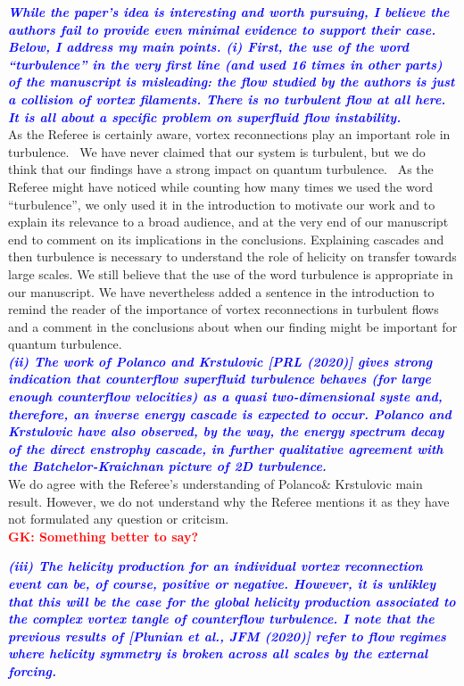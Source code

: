 \documentclass[a4paper,10pt]{article}
\def\red#1{\textcolor{red}{#1}}
\def\blue#1{\textcolor{blue}{#1}}
\def\refcomment#1{\textbf{\blue{\emph{#1}}}\\}
\begin{document}
\refcomment{While the paper’s idea is interesting and worth pursuing, I believe the authors fail to provide even minimal evidence to support their case. Below, I address my main points.
(i) First, the use of the word “turbulence” in the very first line (and used 16 times in other parts) of the manuscript is misleading: the flow studied by the authors is just a collision of vortex filaments. There is no turbulent flow at all here. It is all about a specific problem on superfluid flow instability.}

As the Referee is certainly aware, vortex reconnections play an important role in turbulence.  We have never claimed that our system is turbulent, but we do think that our findings have a strong impact on quantum turbulence.  As the Referee might have noticed while counting how many times we used the word “turbulence”, we only used it in the introduction to motivate our work and to explain its relevance to a broad audience, and at the very end of our manuscript end to comment on its implications in the conclusions. Explaining cascades and then turbulence is necessary to understand the role of helicity on transfer towards large scales. We still believe that the use of the word turbulence is appropriate in our manuscript. We have nevertheless added a sentence in the introduction to remind the reader of the importance of vortex reconnections in turbulent flows and a comment in the conclusions about when our finding might be important for quantum turbulence. \\

\refcomment{(ii) The work of Polanco and Krstulovic [PRL (2020)] gives strong indication that counterflow superfluid turbulence behaves (for large enough counterflow velocities) as a quasi two-dimensional syste and, therefore, an inverse energy cascade is expected to occur. Polanco and Krstulovic have also observed, by the way, the energy spectrum decay of the direct enstrophy cascade, in further qualitative agreement with the Batchelor-Kraichnan picture of 2D turbulence.}

We do agree with the Referee’s understanding of Polanco\& Krstulovic main result. However, we do not understand why the Referee mentions it as they have not formulated any question or critcism.\\

\red{\textbf{GK: Something better to say?}}

\refcomment{(iii) The helicity production for an individual vortex reconnection event can be, of course, positive or negative. However, it is unlikley that this will be the case for the global helicity production associated to the complex vortex tangle of counterflow turbulence. I note that the previous results of [Plunian et al., JFM (2020)] refer to flow regimes where helicity symmetry is broken across all scales by the external forcing.}
\end{document}
